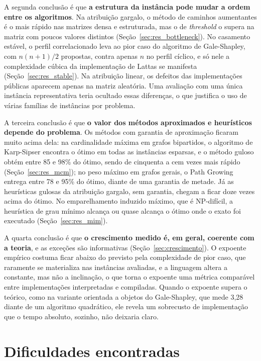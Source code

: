 A segunda conclusão é que \textbf{a estrutura da instância pode mudar a ordem entre os algoritmos}. Na atribuição gargalo, o método de caminhos aumentantes é o mais rápido nas matrizes densa e estruturada, mas o de \textit{threshold} o supera na matriz com poucos valores distintos (Seção~\ref{sec:res_bottleneck}). No casamento estável, o perfil correlacionado leva ao pior caso do algoritmo de Gale-Shapley, com $n(n+1)/2$ propostas, contra apenas $n$ no perfil cíclico, e só nele a complexidade cúbica da implementação de Lattas se manifesta (Seção~\ref{sec:res_stable}). Na atribuição linear, os defeitos das implementações públicas aparecem apenas na matriz aleatória. Uma avaliação com uma única instância representativa teria ocultado essas diferenças, o que justifica o uso de várias famílias de instâncias por problema.

A terceira conclusão é que \textbf{o valor dos métodos aproximados e heurísticos depende do problema}. Os métodos com garantia de aproximação ficaram muito acima dela: na cardinalidade máxima em grafos bipartidos, o algoritmo de Karp-Sipser encontra o ótimo em todas as instâncias esparsas, e o método guloso obtém entre 85 e 98\% do ótimo, sendo de cinquenta a cem vezes mais rápido (Seção~\ref{sec:res_mcm}); no peso máximo em grafos gerais, o Path Growing entrega entre 78 e 95\% do ótimo, diante de uma garantia de metade. Já as heurísticas gulosas da atribuição gargalo, sem garantia, chegam a ficar doze vezes acima do ótimo. No emparelhamento induzido máximo, que é NP-difícil, a heurística de grau mínimo alcança ou quase alcança o ótimo onde o exato foi executado (Seção~\ref{sec:res_mim}).

A quarta conclusão é que \textbf{o crescimento medido é, em geral, coerente com a teoria}, e as exceções são informativas (Seção~\ref{sec:crescimento}). O expoente empírico costuma ficar abaixo do previsto pela complexidade de pior caso, que raramente se materializa nas instâncias avaliadas, e a linguagem altera a constante, mas não a inclinação, o que torna o expoente uma métrica comparável entre implementações interpretadas e compiladas. Quando o expoente supera o teórico, como na variante orientada a objetos do Gale-Shapley, que mede 3{,}28 diante de um algoritmo quadrático, ele revela um sobrecusto de implementação que o tempo absoluto, sozinho, não deixaria claro.

\section{Dificuldades encontradas}
\label{sec:dificuldades}


